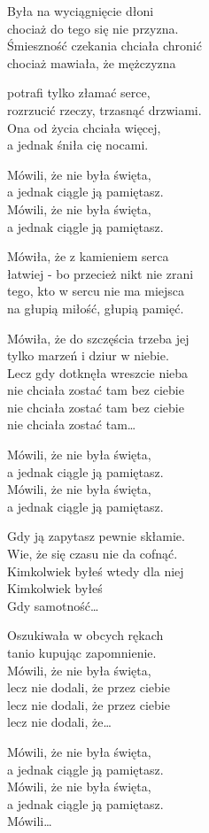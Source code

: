 \begin{text}
\hfill\break
Była na wyciągnięcie dłoni\\
chociaż do tego się nie przyzna.\\
Śmieszność czekania chciała chronić\\
chociaż mawiała, że mężczyzna

potrafi tylko złamać serce,\\
rozrzucić rzeczy, trzasnąć drzwiami.\\
Ona od życia chciała więcej,\\
a jednak śniła cię nocami.

\vin Mówili, że nie była święta,\\
\vin a jednak ciągle ją pamiętasz.\\
\vin Mówili, że nie była święta,\\
\vin a jednak ciągle ją pamiętasz.

\hfill\break
Mówiła, że z kamieniem serca\\
łatwiej - bo przecież nikt nie zrani\\
tego, kto w sercu nie ma miejsca\\
na głupią miłość, głupią pamięć.

Mówiła, że do szczęścia trzeba jej\\
tylko marzeń i dziur w niebie.\\
Lecz gdy dotknęła wreszcie nieba\\
nie chciała zostać tam bez ciebie\\
nie chciała zostać tam bez ciebie\\
nie chciała zostać tam…

\hfill\break
\vin Mówili, że nie była święta,\\
\vin a jednak ciągle ją pamiętasz.\\
\vin Mówili, że nie była święta,\\
\vin a jednak ciągle ją pamiętasz.

\hfill\break
Gdy ją zapytasz pewnie skłamie.\\
Wie, że się czasu nie da cofnąć.\\
Kimkolwiek byłeś wtedy dla niej\\
Kimkolwiek byłeś\\
Gdy samotność…

\hfill\break
Oszukiwała w obcych rękach\\
tanio kupując zapomnienie.\\
Mówili, że nie była święta,\\
lecz nie dodali, że przez ciebie\\
lecz nie dodali, że przez ciebie\\
lecz nie dodali, że…

\hfill\break
\vin Mówili, że nie była święta,\\
\vin a jednak ciągle ją pamiętasz.\\
\vin Mówili, że nie była święta,\\
\vin a jednak ciągle ją pamiętasz.\\
\vin Mówili…

\end{text}
